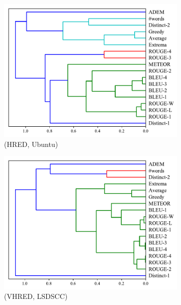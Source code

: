\begin{figure}[htb]
\begin{subfigure}{0.35\linewidth}
        \centering
        \includegraphics[width=\linewidth]{figure/plot/hierarchy/v3/pearson/hred/ubuntu/plot.pdf}
        \caption{(HRED, Ubuntu)}
    \end{subfigure}
    \begin{subfigure}{0.35\linewidth}
        \centering
        \includegraphics[width=\linewidth]{figure/plot/hierarchy/v3/pearson/vhred/lsdscc/plot.pdf}
        \caption{(VHRED, LSDSCC)}
    \end{subfigure}%
    \begin{subfigure}{0.35\linewidth}
        \centering

\end{subfigure}
\end{figure}
